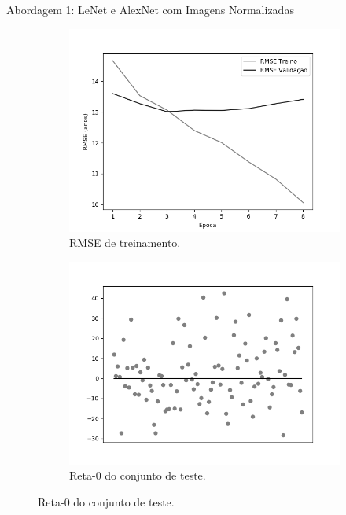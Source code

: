 \begin{frame}{Abordagem 1: LeNet e AlexNet com Imagens Normalizadas}
\begin{figure}[h!]
  \caption{Resultados do treinamento e teste da CNN LeNet \emph{ReLU}.}
  \begin{subfigure}[hb]{0.4\textwidth}
    \caption{RMSE de treinamento.}
    \includegraphics[width=\linewidth]{img/graficos/history/lenet/fig-history-image-treat-1-lenet-relu-rmse.png}%
  \end{subfigure}%
  \begin{subfigure}[hb]{0.4\textwidth}
    \caption{Reta-0 do conjunto de teste.}
    \includegraphics[width=\linewidth]{img/graficos/reta0/lenet/fig-reta-0-image-treat-1-lenet-relu.png}%
  \end{subfigure}
\end{figure}
\end{frame}

